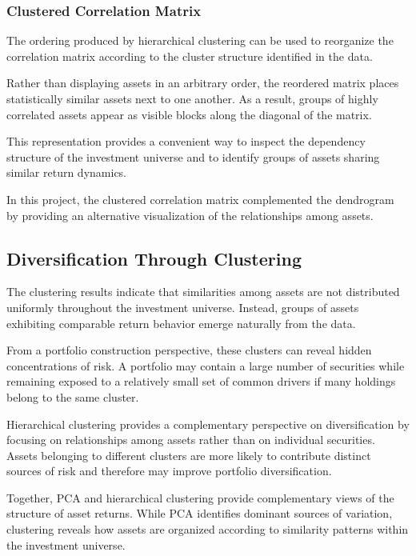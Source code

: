 \documentclass[
  12pt,
  letterpaper,
]{book}
\begin{document}
\subsubsection{Clustered Correlation
Matrix}\label{clustered-correlation-matrix}

The ordering produced by hierarchical clustering can be used to
reorganize the correlation matrix according to the cluster structure
identified in the data.

Rather than displaying assets in an arbitrary order, the reordered
matrix places statistically similar assets next to one another. As a
result, groups of highly correlated assets appear as visible blocks
along the diagonal of the matrix.

This representation provides a convenient way to inspect the dependency
structure of the investment universe and to identify groups of assets
sharing similar return dynamics.

In this project, the clustered correlation matrix complemented the
dendrogram by providing an alternative visualization of the
relationships among assets.

\subsection{Diversification Through
Clustering}\label{diversification-through-clustering}

The clustering results indicate that similarities among assets are not
distributed uniformly throughout the investment universe. Instead,
groups of assets exhibiting comparable return behavior emerge naturally
from the data.

From a portfolio construction perspective, these clusters can reveal
hidden concentrations of risk. A portfolio may contain a large number of
securities while remaining exposed to a relatively small set of common
drivers if many holdings belong to the same cluster.

Hierarchical clustering provides a complementary perspective on
diversification by focusing on relationships among assets rather than on
individual securities. Assets belonging to different clusters are more
likely to contribute distinct sources of risk and therefore may improve
portfolio diversification.

Together, PCA and hierarchical clustering provide complementary views of
the structure of asset returns. While PCA identifies dominant sources of
variation, clustering reveals how assets are organized according to
similarity patterns within the investment universe.
\end{document}
